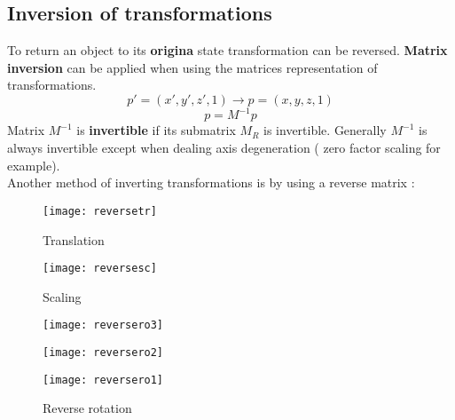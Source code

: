 \subsection{Inversion of transformations}
To return an object to its \textbf{origina} state transformation can be reversed. \textbf{Matrix inversion} can be applied when using the matrices representation of transformations.
$$ p'=(x',y',z',1) \to p=(x,y,z,1)$$
$$ p =M^{-1}p$$
Matrix $M^{-1}$ is \textbf{invertible} if its submatrix $M_R$ is invertible.
Generally $M^{-1}$ is always invertible except when dealing axis degeneration ( zero factor scaling for example).\\
Another method of inverting transformations is by using a reverse matrix : 
\begin{figure}[H]
\begin{minipage}{.5\textwidth}
 \centering
  \texttt{[image: reversetr]}
  \caption{Translation}
\end{minipage}%
	\begin{minipage}{.5\textwidth}
  \centering
  \texttt{[image: reversesc]}
  \caption{Scaling}
\end{minipage}%
\end{figure}
\begin{figure}[H]
\begin{minipage}{.325\textwidth}
 \centering
  \texttt{[image: reversero3]}
\end{minipage}%
	\begin{minipage}{.325\textwidth}
  \centering
  \texttt{[image: reversero2]}
\end{minipage}%
\begin{minipage}{.35\textwidth}
  \centering
  \texttt{[image: reversero1]}
\end{minipage}%
\caption{Reverse rotation}
\end{figure}
\newpage
